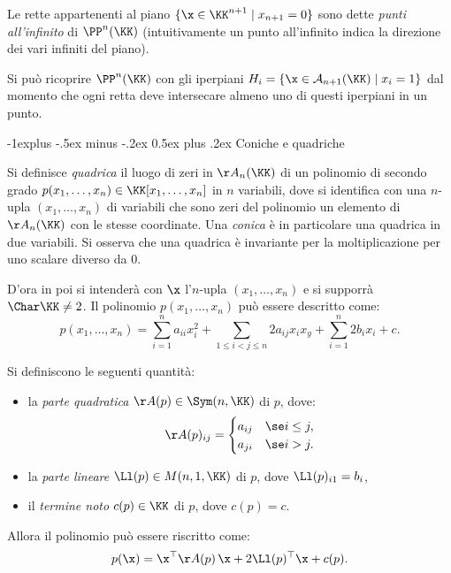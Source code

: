 \documentclass[10pt,landscape]{article}
\makeatletter
\renewcommand{\subsection}{\@startsection{subsection}{2}{0mm}%
	{-1explus -.5ex minus -.2ex}%
	{0.5ex plus .2ex}%
	{\normalfont\normalsize\bfseries}}
\makeatother
\begin{document}
\begin{multicols}{3}
        Le rette appartenenti al piano $\{\x \in \KK^{n+1} \mid x_{n+1}=0\}$ sono dette \textit{punti all'infinito} di $\PP^n(\KK)$ (intuitivamente un punto all'infinito indica la direzione dei vari infiniti del piano).

        Si può ricoprire $\PP^n(\KK)$ con gli iperpiani $H_i=\{\x\in \mathcal{A}_{n+1}(\KK)\mid x_{i}=1\}$ dal momento che ogni retta deve intersecare almeno uno di questi iperpiani in un punto.
		
		\subsection{Coniche e quadriche}
	
		Si definisce \textit{quadrica} il luogo di zeri in $\AA_n(\KK)$ di un polinomio
		di secondo grado $p(x_1, \ldots, x_n) \in \KK[x_1, \ldots, x_n]$ in $n$ variabili, dove si identifica con
		una $n$-upla $(x_1, \ldots, x_n)$ di variabili che sono zeri del polinomio
		un elemento di $\AA_n(\KK)$ con le stesse coordinate.
        Una \textit{conica} è in particolare una quadrica in due variabili. Si osserva che
        una quadrica è invariante per la moltiplicazione per uno scalare diverso
        da $0$.

        D'ora in poi si intenderà con $\x$ l'$n$-upla $(x_1, \ldots, x_n)$ e si supporrà
        $\Char \KK \neq 2$. Il polinomio $p(x_1, \ldots, x_n)$ può essere descritto come:
        \[ p(x_1, \ldots, x_n) = \sum_{i=1}^n a_{ii} x_i^2 + \sum_{1 \leq i<j\leq n} 2 a_{ij} x_i x_y + \sum_{i=1}^n 2 b_i x_i + c. \]
        
        Si definiscono le seguenti quantità:
        
        \begin{itemize}
        	\item la \textit{parte quadratica} $\AA(p) \in \Sym(n, \KK)$ di $p$, dove:
        	\[ \AA(p)_{ij} = \begin{cases}
        		a_{ij} & \se i \leq j, \\
        		a_{ji} & \se i > j.
        	\end{cases} \]
        	\item la \textit{parte lineare} $\Ll(p) \in M(n, 1, \KK)$ di $p$, dove $\Ll(p)_{i1} = b_i$,
        	\item il \textit{termine noto} $c(p) \in \KK$ di $p$, dove $c(p) = c$.
        \end{itemize}
        Allora il polinomio può essere riscritto come:
        \[ p(\x) = \x^\top \AA(p) \, \x + 2 \Ll(p)^\top \x + c(p). \]


\end{multicols}
\end{document}
